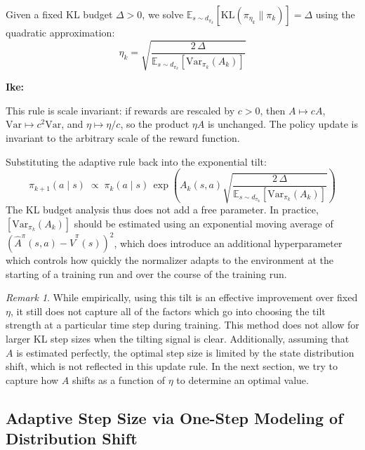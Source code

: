 \documentclass[11pt]{article}
\theoremstyle{definition}
\theoremstyle{remark}
\newtheorem{remark}[theorem]{Remark}
\newenvironment{ike}{\color{blue}\textbf{Ike:}\\}{}
\newcommand{\KL}{\mathrm{KL}}
\newcommand{\Var}{\mathrm{Var}}
\newcommand{\E}{\mathbb{E}}
\begin{document}
Given a fixed KL budget $\Delta > 0$, we solve $\E_{s \sim d_{\pi_k}}[\KL(\pi_{\eta_k} \| \pi_k)] = \Delta$ using the quadratic approximation:
\begin{equation}\label{eq:eta-rule}
  \boxed{\;\eta_k = \sqrt{\frac{2\,\Delta}{\E_{s \sim d_{\pi_k}}[\Var_{\pi_k}(A_k)]}}\;}
\end{equation}

\begin{ike}
    
\end{ike}

This rule is scale invariant: if rewards are rescaled by $c > 0$, then $A \mapsto cA$, $\Var \mapsto c^2\Var$, and $\eta \mapsto \eta/c$, so the product $\eta A$ is unchanged. The policy update is invariant to the arbitrary scale of the reward function.

Substituting the adaptive rule back into the exponential tilt:
\[
  \pi_{k+1}(a \mid s) \;\propto\; \pi_k(a \mid s)\,\exp\!\left(A_k(s,a)\sqrt{\frac{2\,\Delta}{\E_{s \sim d_{\pi_k}}[\Var_{\pi_k}(A_k)]}}\right)
\]
The KL budget analysis thus does not add a free parameter. In practice, $[\Var_{\pi_k}(A_k)]$ should be estimated using an exponential moving average of $(\hat{A}^\pi(s,a)-\hat{V}^\pi(s))^2$, which does introduce an additional hyperparameter which controls how quickly the normalizer adapts to the environment at the starting of a training run and over the course of the training run. 

\begin{remark}
While empirically, using this tilt is an effective improvement over fixed $\eta$, it still does not capture all of the factors which go into choosing the tilt strength at a particular time step during training. This method does not allow for larger KL step sizes when the tilting signal is clear. Additionally, assuming that $A$ is estimated perfectly, the optimal step size is limited by the state distribution shift, which is not reflected in this update rule. In the next section, we try to capture how $A$ shifts as a function of $\eta$ to determine an optimal value.
\end{remark}

\subsection{Adaptive Step Size via One-Step Modeling of Distribution Shift}
\label{sec:optimal-eta}
\end{document}
